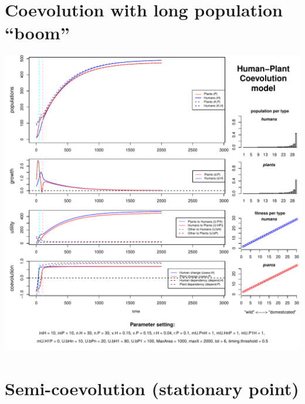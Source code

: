 \documentclass[
]{book}
\begin{document}
\newpage

\hypertarget{coevolution-with-long-population-boom}{%
\section{Coevolution with long population ``boom''}\label{coevolution-with-long-population-boom}}

\includegraphics{hpcModel-exploration_files/figure-latex/1_run.coevo.long.boom-plot-1.pdf}

\newpage

\hypertarget{semi-coevolution-stationary-point}{%
\section{Semi-coevolution (stationary point)}\label{semi-coevolution-stationary-point}}
\end{document}
